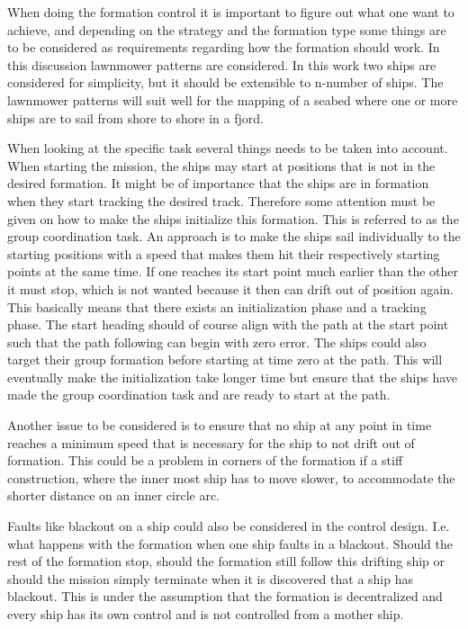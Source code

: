 When doing the formation control it is important to figure out what one
want to achieve, and depending on the strategy and the formation type
some things are to be considered as requirements regarding how the
formation should work. In this discussion lawnmower patterns are considered. In this work two ships are considered for simplicity, but it should be extensible to n-number of ships. The lawnmower patterns will suit well for the mapping of a seabed where one or more ships are to sail from shore to shore in a fjord.

When looking at the specific task several things needs to be taken into account. When starting the mission, the ships may start at positions that is not in the desired formation. It might be of importance that the ships are in
formation when they start tracking the desired track. Therefore some
attention must be given on how to make the ships initialize this
formation. This is referred to as the group coordination task. An approach is to make the ships sail individually to the
starting positions with a speed that makes them hit their respectively starting points at
the same time. If one reaches its start point much earlier
than the other it must stop, which is not wanted because it then can
drift out of position again. This basically means that there exists an initialization
phase and a tracking phase. The start heading should of
course align with the path at the start point such that the path following can begin with zero error. The ships could also target their group formation before starting at time zero at the path. This will eventually make the initialization take longer time but ensure that the ships have made the group coordination task and are ready to start at the path.

Another issue to be considered is to ensure that no ship at
any point in time reaches a minimum speed that is necessary for the
ship to not drift out of formation. This could be a problem in corners
of the formation if a stiff construction, where the inner most ship
has to move slower, to accommodate the shorter distance on an inner
circle arc.

Faults like blackout on a ship could also be considered in the control
design. I.e. what happens with the formation when one ship faults in a
blackout. Should the rest of the formation stop, should the formation
still follow this drifting ship or should the mission simply terminate
when it is discovered that a ship has blackout. This is under the assumption that the formation is decentralized and every ship has its own control and is not controlled from a mother ship.

